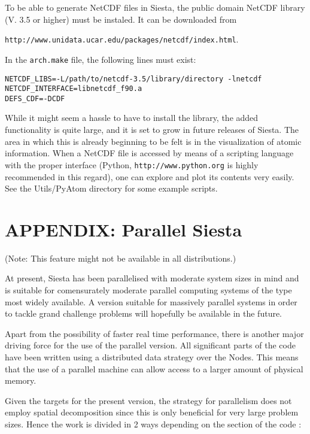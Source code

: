 \documentclass[11pt]{article}
\begin{document}
To be able to generate NetCDF files in {\sc Siesta}, the public domain
NetCDF library (V. 3.5 or higher) must be instaled. It can be
downloaded from 

{\tt http://www.unidata.ucar.edu/packages/netcdf/index.html}. 

In the {\tt arch.make} file, the following lines must exist:
\begin{verbatim}
NETCDF_LIBS=-L/path/to/netcdf-3.5/library/directory -lnetcdf
NETCDF_INTERFACE=libnetcdf_f90.a
DEFS_CDF=-DCDF
\end{verbatim}

While it might seem a hassle to have to install the library, the 
added functionality is quite large, and it is set to grow in future
releases of {\sc Siesta}. The area in which this is already beginning to be
felt is in the visualization of atomic information. When a NetCDF file
is accessed by means of a scripting language with the proper
interface (Python, {\tt http://www.python.org} is highly recommended
in this regard), one can explore and plot its contents very easily.
See the Utils/PyAtom directory for some example scripts.


\newpage
\section{APPENDIX: Parallel {\sc Siesta}}

(Note: This feature might not be available in all distributions.)

At present, {\sc Siesta} has been parallelised with moderate system sizes
in mind and is suitable for comensurately moderate parallel computing
systems of the type most widely available. A version suitable for
massively parallel systems in order to tackle grand challenge problems
will hopefully be available in the future.

Apart from the possibility of faster real time performance, there is
another major driving force for the use of the parallel version. All
significant parts of the code have been written using a distributed
data strategy over the Nodes. This means that the use of a parallel
machine can allow access to a larger amount of physical memory.

Given the targets for the present version, the strategy for parallelism
does not employ spatial decomposition since this is only beneficial for
very large problem sizes. Hence the work is divided in 2 ways depending
on the section of the code :
\end{document}
